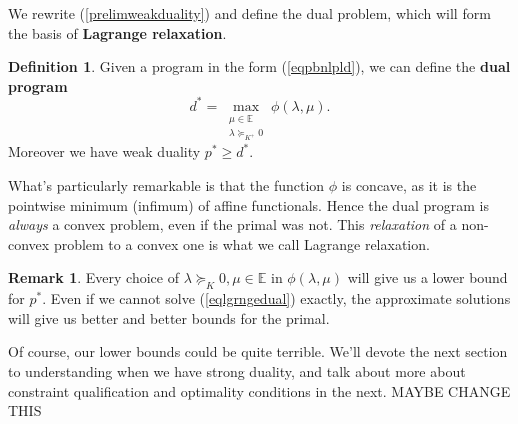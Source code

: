 \documentclass{article}
\numberwithin{equation}{section}
\theoremstyle{definition}
\newtheorem{definition}[theorem]{Definition}%
\newtheorem{remark}[theorem]{Remark}
\newcommand{\bE}{\mathbb{E}}
\begin{document}
We rewrite (\ref{prelimweakduality}) and define the dual problem, which will form the basis of \textbf{Lagrange relaxation}.
\begin{definition}
    Given a program in the form (\ref{eqpbnlpld}), we can define the \textbf{dual program}
    \begin{equation}
        \label{eqlgrngedual}
        d^*=\max_{\substack{\mu\in\bE\\\lambda\succeq_{K^+} 0 }}\phi(\lambda,\mu).
    \end{equation}
    Moreover we have weak duality $p^*\ge d^*$.
\end{definition}
What's particularly remarkable is that the function $\phi$ is concave, as it is the pointwise minimum (infimum) of affine functionals. Hence the dual program is \textit{always} a convex problem, even if the primal was not. This \textit{relaxation} of a non-convex problem to a convex one is what we call Lagrange relaxation.
\begin{remark}
Every choice of $\lambda\succeq_K0,\mu\in\bE$ in $\phi(\lambda,\mu)$ will give us a lower bound for $p^*$. Even if we cannot solve (\ref{eqlgrngedual}) exactly, the approximate solutions will give us better and better bounds for the primal.
\end{remark}
Of course, our lower bounds could be quite terrible. We'll devote the next section to understanding when we have strong duality, and talk about more about constraint qualification and optimality conditions in the next. MAYBE CHANGE THIS
\end{document}
